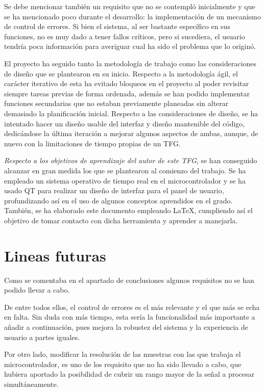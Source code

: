 Se debe mencionar también un requisito que no se contempló inicialmente y que se ha mencionado poco durante el desarrollo: la implementación de un mecanismo de control de errores. Si bien el sistema, al ser bastante específico en sus funciones, no es muy dado a tener fallos críticos, pero si sucediera, el usuario tendría poca información para averiguar cual ha sido el problema que lo originó.
 
El proyecto ha seguido tanto la metodología de trabajo como las consideraciones de diseño que se plantearon en su inicio. Respecto a la metodología ágil, el carácter iterativo de esta ha evitado bloqueos en el proyecto al poder revisitar siempre tareas previas de forma ordenada, además se han podido implementar funciones secundarias que no estaban previamente planeadas sin alterar demasiado la planificación inicial.  Respecto a las consideraciones de diseño, se ha intentado hacer un diseño usable del interfaz y diseño mantenible del código, dedicándose la última iteración a mejorar algunos aspectos de ambas, aunque, de nuevo con la limitaciones de tiempo propias de un TFG. 

\textit{Respecto a los objetivos de aprendizaje del autor de este TFG}, se han conseguido alcanzar en gran medida los que se plantearon al comienzo del trabajo. Se ha empleado un sistema operativo de tiempo real en el microcontrolador y se ha usado QT para realizar un diseño de interfaz para el panel de usuario, profundizando así en el uso de algunos conceptos aprendidos en el grado. También, se ha elaborado este documento empleando \LaTeX, cumpliendo así el objetivo de tomar contacto con dicha herramienta y aprender a manejarla.


\section{Lineas futuras}

Como se comentaba en el apartado de conclusiones algunos requisitos no se han podido llevar a cabo. 

De entre todos ellos, el control de errores es el más relevante y el que más se echa en falta. Sin duda con más tiempo, esta sería la funcionalidad más importante a añadir a continuación, pues mejora la robustez del sistema y la experiencia de usuario a partes iguales.

Por otro lado, modificar la resolución de las muestras con las que trabaja el microcontrolador, es uno de los requisito que no ha sido llevado a cabo, que hubiera aportado la posibilidad de cubrir un rango mayor de la señal a procesar simultáneamente.

